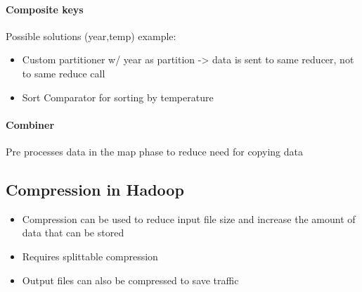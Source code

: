 \documentclass[10pt,a4paper]{scrreprt}
\begin{document}
\paragraph{Composite keys}
Possible solutions (year,temp) example:
\begin{itemize}
	\item Custom partitioner w/ year as partition -> data is sent to same reducer, not to same reduce call
	\item Sort Comparator for sorting by temperature
\end{itemize}

\paragraph{Combiner} Pre processes data in the map phase to reduce need for copying data

\subsection{Compression in Hadoop}
\begin{itemize}
	\item Compression can be used to reduce input file size and increase the amount of data that can be stored
	\item Requires splittable compression
	\item Output files can also be compressed to save traffic
\end{itemize}
\end{document}
